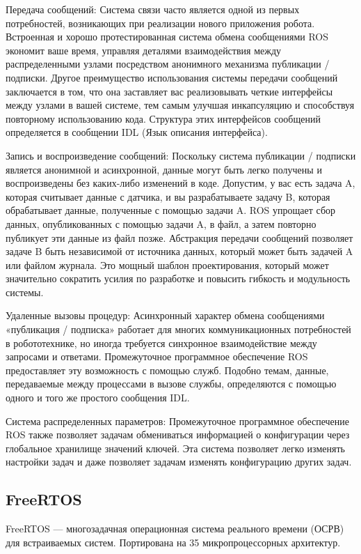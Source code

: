 \documentclass[a4paper,12pt]{article}
\begin{document}
Передача сообщений:
Система связи часто является одной из первых потребностей, возникающих при реализации нового приложения робота. Встроенная и хорошо протестированная система обмена сообщениями ROS экономит ваше время, управляя деталями взаимодействия между распределенными узлами посредством анонимного механизма публикации / подписки. Другое преимущество использования системы передачи сообщений заключается в том, что она заставляет вас реализовывать четкие интерфейсы между узлами в вашей системе, тем самым улучшая инкапсуляцию и способствуя повторному использованию кода. Структура этих интерфейсов сообщений определяется в сообщении IDL (Язык описания интерфейса).

Запись и воспроизведение сообщений:
Поскольку система публикации / подписки является анонимной и асинхронной, данные могут быть легко получены и воспроизведены без каких-либо изменений в коде. Допустим, у вас есть задача A, которая считывает данные с датчика, и вы разрабатываете задачу B, которая обрабатывает данные, полученные с помощью задачи A. ROS упрощает сбор данных, опубликованных с помощью задачи A, в файл, а затем повторно публикует эти данные из файл позже. Абстракция передачи сообщений позволяет задаче B быть независимой от источника данных, который может быть задачей A или файлом журнала. Это мощный шаблон проектирования, который может значительно сократить усилия по разработке и повысить гибкость и модульность системы.

Удаленные вызовы процедур:
Асинхронный характер обмена сообщениями «публикация / подписка» работает для многих коммуникационных потребностей в робототехнике, но иногда требуется синхронное взаимодействие между запросами и ответами. Промежуточное программное обеспечение ROS предоставляет эту возможность с помощью служб. Подобно темам, данные, передаваемые между процессами в вызове службы, определяются с помощью одного и того же простого сообщения IDL.

Система распределенных параметров:
Промежуточное программное обеспечение ROS также позволяет задачам обмениваться информацией о конфигурации через глобальное хранилище значений ключей. Эта система позволяет легко изменять настройки задач и даже позволяет задачам изменять конфигурацию других задач.

\subsection{FreeRTOS}
FreeRTOS — многозадачная операционная система реального времени (ОСРВ) для встраиваемых систем. Портирована на 35 микропроцессорных архитектур. 
\end{document}
